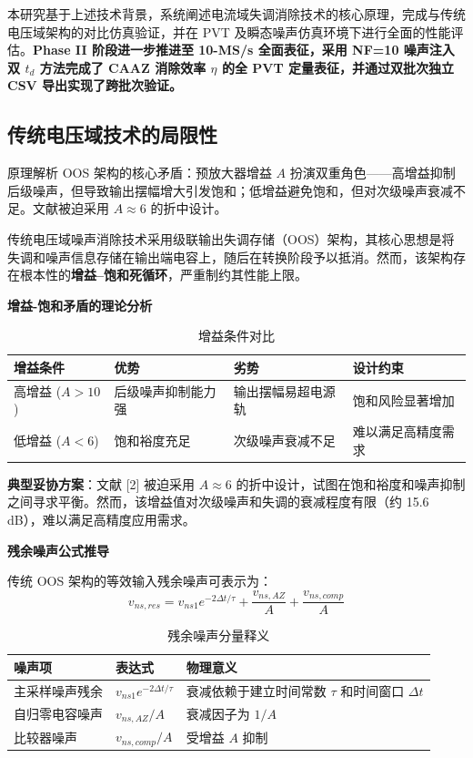 \documentclass[11pt,a4paper,UTF8]{ctexart}
\begin{document}
本研究基于上述技术背景，系统阐述电流域失调消除技术的核心原理，完成与传统电压域架构的对比仿真验证，并在 PVT 及瞬态噪声仿真环境下进行全面的性能评估。\textbf{Phase II 阶段进一步推进至 10-MS/s 全面表征，采用 NF=10 噪声注入双 $t_d$ 方法完成了 CAAZ 消除效率 $\eta$ 的全 PVT 定量表征，并通过双批次独立 CSV 导出实现了跨批次验证。}

\subsection{传统电压域技术的局限性}

\begin{prinbox}{原理解析}
OOS 架构的核心矛盾：预放大器增益 $A$ 扮演双重角色——高增益抑制后级噪声，但导致输出摆幅增大引发饱和；低增益避免饱和，但对次级噪声衰减不足。文献被迫采用 $A \approx 6$ 的折中设计。
\end{prinbox}

传统电压域噪声消除技术采用级联输出失调存储（OOS）架构，其核心思想是将失调和噪声信息存储在输出端电容上，随后在转换阶段予以抵消。然而，该架构存在根本性的\textbf{增益--饱和死循环}，严重制约其性能上限。

\textbf{增益-饱和矛盾的理论分析}

\begin{table}[htbp]\centering\caption{增益条件对比}\label{tab:gain}\small
\begin{tabular}{llll}\toprule
\textbf{增益条件} & \textbf{优势} & \textbf{劣势} & \textbf{设计约束} \\\midrule
高增益 ($A > 10$) & 后级噪声抑制能力强 & 输出摆幅易超电源轨 & 饱和风险显著增加 \\
低增益 ($A < 6$) & 饱和裕度充足 & 次级噪声衰减不足 & 难以满足高精度需求 \\\bottomrule
\end{tabular}
\end{table}

\textbf{典型妥协方案}：文献 [2] 被迫采用 $A \approx 6$ 的折中设计，试图在饱和裕度和噪声抑制之间寻求平衡。然而，该增益值对次级噪声和失调的衰减程度有限（约 15.6 dB），难以满足高精度应用需求。

\textbf{残余噪声公式推导}

传统 OOS 架构的等效输入残余噪声可表示为：
\begin{equation}
v_{ns,res} = v_{ns1} e^{-2\Delta t/\tau} + \frac{v_{ns,AZ}}{A} + \frac{v_{ns,comp}}{A}
\label{eq:oos}
\end{equation}

\begin{table}[htbp]\centering\caption{残余噪声分量释义}\label{tab:noisecomp}\small
\begin{tabular}{lll}\toprule
\textbf{噪声项} & \textbf{表达式} & \textbf{物理意义} \\\midrule
主采样噪声残余 & $v_{ns1} e^{-2\Delta t/\tau}$ & 衰减依赖于建立时间常数 $\tau$ 和时间窗口 $\Delta t$ \\
自归零电容噪声 & $v_{ns,AZ} / A$ & 衰减因子为 $1/A$ \\
比较器噪声 & $v_{ns,comp} / A$ & 受增益 $A$ 抑制 \\\bottomrule
\end{tabular}
\end{table}
\end{document}
